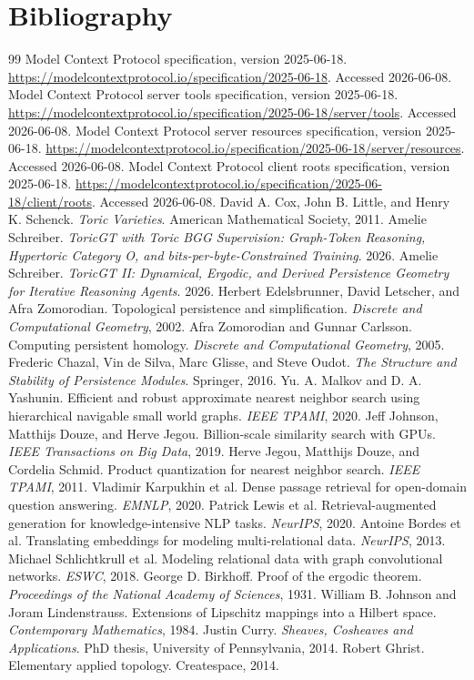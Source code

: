 \documentclass[11pt]{article}
\numberwithin{equation}{section}
\begin{document}
\section{Bibliography}
\begin{thebibliography}{99}
 Model Context Protocol specification, version 2025-06-18. \url{https://modelcontextprotocol.io/specification/2025-06-18}. Accessed 2026-06-08.
 Model Context Protocol server tools specification, version 2025-06-18. \url{https://modelcontextprotocol.io/specification/2025-06-18/server/tools}. Accessed 2026-06-08.
 Model Context Protocol server resources specification, version 2025-06-18. \url{https://modelcontextprotocol.io/specification/2025-06-18/server/resources}. Accessed 2026-06-08.
 Model Context Protocol client roots specification, version 2025-06-18. \url{https://modelcontextprotocol.io/specification/2025-06-18/client/roots}. Accessed 2026-06-08.
 David A. Cox, John B. Little, and Henry K. Schenck. \emph{Toric Varieties}. American Mathematical Society, 2011.
 Amelie Schreiber. \emph{ToricGT with Toric BGG Supervision: Graph-Token Reasoning, Hypertoric Category O, and bits-per-byte-Constrained Training}. 2026.
 Amelie Schreiber. \emph{ToricGT II: Dynamical, Ergodic, and Derived Persistence Geometry for Iterative Reasoning Agents}. 2026.
 Herbert Edelsbrunner, David Letscher, and Afra Zomorodian. Topological persistence and simplification. \emph{Discrete and Computational Geometry}, 2002.
 Afra Zomorodian and Gunnar Carlsson. Computing persistent homology. \emph{Discrete and Computational Geometry}, 2005.
 Frederic Chazal, Vin de Silva, Marc Glisse, and Steve Oudot. \emph{The Structure and Stability of Persistence Modules}. Springer, 2016.
 Yu. A. Malkov and D. A. Yashunin. Efficient and robust approximate nearest neighbor search using hierarchical navigable small world graphs. \emph{IEEE TPAMI}, 2020.
 Jeff Johnson, Matthijs Douze, and Herve Jegou. Billion-scale similarity search with GPUs. \emph{IEEE Transactions on Big Data}, 2019.
 Herve Jegou, Matthijs Douze, and Cordelia Schmid. Product quantization for nearest neighbor search. \emph{IEEE TPAMI}, 2011.
 Vladimir Karpukhin et al. Dense passage retrieval for open-domain question answering. \emph{EMNLP}, 2020.
 Patrick Lewis et al. Retrieval-augmented generation for knowledge-intensive NLP tasks. \emph{NeurIPS}, 2020.
 Antoine Bordes et al. Translating embeddings for modeling multi-relational data. \emph{NeurIPS}, 2013.
 Michael Schlichtkrull et al. Modeling relational data with graph convolutional networks. \emph{ESWC}, 2018.
 George D. Birkhoff. Proof of the ergodic theorem. \emph{Proceedings of the National Academy of Sciences}, 1931.
 William B. Johnson and Joram Lindenstrauss. Extensions of Lipschitz mappings into a Hilbert space. \emph{Contemporary Mathematics}, 1984.
 Justin Curry. \emph{Sheaves, Cosheaves and Applications}. PhD thesis, University of Pennsylvania, 2014.
 Robert Ghrist. Elementary applied topology. Createspace, 2014.
\end{thebibliography}
\end{document}
